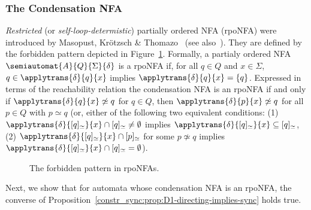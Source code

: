 


\subsubsection{The Condensation NFA}


\emph{Restricted} (or \emph{self-loop-determistic}) partially ordered NFA (rpoNFA)
were introduced by Masopust, Kr{\"{o}}tzsch \& Thomazo~\cite{DBLP:journals/iandc/KrotzschMT17}
(see also~\cite{DBLP:journals/lmcs/MasopustK21}). They are defined by the forbidden
pattern depicted in Figure~\ref{constr_sync:fig:rpoNFA}. Formally, a partialy ordered NFA $\semiautomat{A}{Q}{\Sigma}{\delta}$
is a rpoNFA if, for all $q \in Q$ and $x \in \Sigma$, $q \in \applytrans{\delta}{q}{x}$
implies $\applytrans{\delta}{q}{x} = \{q\}$. Expressed in terms of
the reachability relation the condensation NFA is an rpoNFA  
if and only if $\applytrans{\delta}{q}{x} \not\simeq q$ for $q \in Q$,
then $\applytrans{\delta}{p}{x} \not\simeq q$ for all $p \in Q$ with $p \simeq q$ (or, either of the following two equivalent conditions: (1) $\applytrans{\delta}{[q]_{\simeq}}{x} \cap [q]_{\simeq} \ne \emptyset$
implies $\applytrans{\delta}{[q]_{\simeq}}{x} \subseteq [q]_{\simeq}$,
(2) $\applytrans{\delta}{[q]_{\simeq}}{x} \cap [p]_{\simeq}$ for some $p \not\simeq q$
implies $\applytrans{\delta}{[q]_{\simeq}}{x} \cap [q]_{\simeq} = \emptyset$).


\begin{figure}
    \centering
    \caption{The forbidden pattern in rpoNFAs.}
    \label{constr_sync:fig:rpoNFA}
\end{figure}


Next, we show that for automata whose condensation NFA is an rpoNFA,
the converse of Proposition~\ref{constr_sync:prop:D1-directing-implies-sync} holds true.






